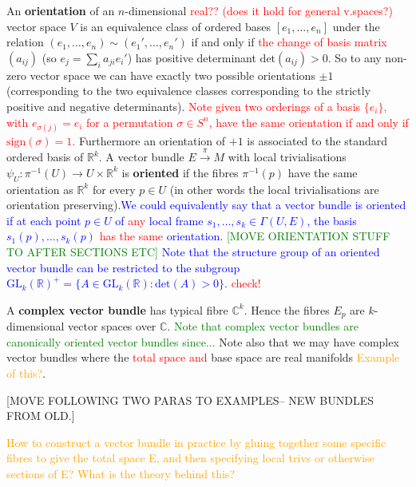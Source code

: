 \documentclass[a4paper]{article}
\theoremstyle{definition} \newtheorem*{definition}{Definition}
\theoremstyle{definition} \newtheorem*{definitions}{Definitions}
\theoremstyle{plain} \newtheorem{theorem}{Theorem}[section]
\theoremstyle{plain} \newtheorem{proposition}[theorem]{Proposition}
\theoremstyle{plain} \newtheorem{corollary}[theorem]{Corollary}
\theoremstyle{plain} \newtheorem{lemma}[theorem]{Lemma}
\theoremstyle{plain} \newtheorem{example}[theorem]{Example}
\newcommand{\checkCorrect}[1]{\textcolor{red}{#1}}
\newcommand{\question}[1]{\textcolor{orange}{#1}}
\newcommand{\explainFurther}[1]{\textcolor{blue}{#1}}
\newcommand{\finish}[1]{\textcolor{green}{#1}}
\newcommand{\defn}[1]{\textbf{#1}}
\newcommand{\realnos}{\mathbb{R}}
\newcommand{\complexnos}{\mathbb{C}}
\begin{document}
An \defn{orientation} of an $n$-dimensional \checkCorrect{real?? (does it hold for general v.spaces?)} vector space $V$ is an equivalence class of ordered bases $[e_1, \ldots, e_n]$ under the relation $(e_1, \ldots, e_n)\sim (e_1', \ldots, e_n')$ if and only if \checkCorrect{the change of basis matrix} $(a_{ij})$ (so $e_j=\sum_i a_{ji}e_i'$) has positive determinant $\mathrm{det}(a_{ij})>0$. So to any non-zero vector space we can have exactly two possible orientations $\pm 1$ (corresponding to the two equivalence classes corresponding to the strictly positive and negative determinants). \checkCorrect{Note given two orderings of a basis $\{e_i\}$, with $e_{\sigma(j)}=e_i$ for a permutation $\sigma\in S^n$, have the same orientation if and only if $\mathrm{sign}(\sigma)=1$.} Furthermore an orientation of $+1$ is associated to the standard ordered basis of $\realnos^k$.  
A vector bundle $E\xrightarrow{\pi} M$ with local trivialisations $\psi_U:\pi^{-1}(U)\to U\times \realnos^k$ is \defn{oriented} if the fibres $\pi^{-1}(p)$ have the same orientation as $\realnos^k$ for every $p \in U$ (in other words the local trivialisations are orientation preserving).\explainFurther{We could equivalently say that a vector bundle is oriented if at each point $p\in U$ of \checkCorrect{any} local frame $s_1, \ldots, s_k\in \Gamma(U, E)$, the basis $s_1(p), \ldots, s_k(p)$ \checkCorrect{has the same} orientation.} 
\finish{[MOVE ORIENTATION STUFF TO AFTER SECTIONS ETC]} \explainFurther{Note that the structure group of an oriented vector bundle can be restricted to the subgroup $\mathrm{GL}_k(\realnos)^+=\{A\in \mathrm{GL}_k(\realnos): \mathrm{det}(A)>0\}$.} \checkCorrect{check!} 

A \defn{complex vector bundle} has typical fibre $\complexnos^k$. Hence the fibres $E_p$ are $k$-dimensional vector spaces over $\complexnos$. \finish{Note that complex vector bundles are canonically oriented vector bundles since...} Note also that we may have complex vector bundles where the \checkCorrect{total space and} base space are real manifolds \question{Example of this?}.

[MOVE FOLLOWING TWO PARAS TO EXAMPLES-- NEW BUNDLES FROM OLD.]

\question{How to construct a vector bundle in practice by gluing together some specific fibres to give the total space E, and then specifying local trivs or otherwise sections of E? What is the theory behind this?}
\end{document}
